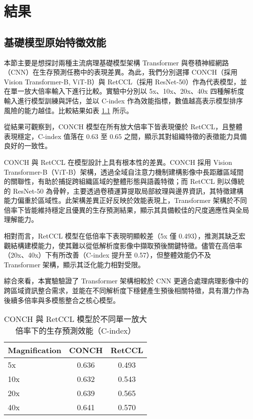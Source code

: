 
\chapter{結果}\label{sec:evalutaion}

\section{基礎模型原始特徵效能}


\label{sec:base_models}
本節主要是想探討兩種主流病理基礎模型架構 Transformer 與卷積神經網路（CNN）在生存預測任務中的表現差異。為此，我們分別選擇 CONCH（採用 Vision Transformer-B, ViT-B）與 RetCCL（採用 ResNet-50）作為代表模型，並在單一放大倍率輸入下進行比較。實驗中分別以 5x、10x、20x、40x 四種解析度輸入進行模型訓練與評估，並以 C-index 作為效能指標，數值越高表示模型排序風險的能力越佳。比較結果如表 \ref{tab:single_magnification_results} 所示。

從結果可觀察到，CONCH 模型在所有放大倍率下皆表現優於 RetCCL，且整體表現穩定，C-index 值落在 0.63 至 0.65 之間，顯示其對組織特徵的表徵能力具備良好的一致性。

CONCH 與 RetCCL 在模型設計上具有根本性的差異。CONCH 採用 Vision Transformer-B（ViT-B）架構，透過全域自注意力機制建構影像中長距離區域間的關聯性，有助於捕捉跨組織區域的整體形態與語義特徵；而 RetCCL 則以傳統的 ResNet-50 為骨幹，主要透過卷積運算提取局部紋理與邊界資訊，其特徵建構能力偏重於區域性。此架構差異正好反映於效能表現上，Transformer 架構於不同倍率下皆能維持穩定且優異的生存預測結果，顯示其具備較佳的尺度適應性與全局理解能力。

相對而言，RetCCL 模型在低倍率下表現明顯較差（5x 僅 0.493），推測其缺乏宏觀結構建模能力，使其難以從低解析度影像中擷取預後關鍵特徵。儘管在高倍率（20x、40x）下有所改善（C-index 提升至 0.57），但整體效能仍不及 Transformer 架構，顯示其泛化能力相對受限。

綜合來看，本實驗驗證了 Transformer 架構相較於 CNN 更適合處理病理影像中的跨區域資訊整合需求，並能在不同解析度下穩健產生預後相關特徵，具有潛力作為後續多倍率與多模態整合之核心模型。

\begin{table}[ht]
\centering
\begin{tabular}{lcc}
\hline
\textbf{Magnification} & \textbf{CONCH} & \textbf{RetCCL} \\
\hline
5x  & 0.636 & 0.493 \\
10x & 0.632 & 0.543 \\
20x & 0.639 & 0.565 \\
40x & 0.641 & 0.570 \\
\hline
\end{tabular}
\caption{CONCH 與 RetCCL 模型於不同單一放大倍率下的生存預測效能（C-index）}
\label{tab:single_magnification_results}
\end{table}


